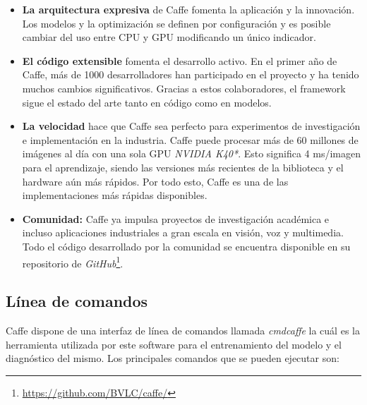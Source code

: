 \documentclass[a4paper, 12pt, spanish, chapterprefix, numbers=noenddot]{book}
\begin{document}
\begin{itemize}
\item \textbf{La arquitectura expresiva} de Caffe fomenta la aplicación y la innovación. Los modelos y la optimización se definen por configuración y es posible cambiar del uso entre CPU y GPU modificando un único indicador.
\item \textbf{El código extensible} fomenta el desarrollo activo. En el primer año de Caffe, más de 1000 desarrolladores han participado en el proyecto y ha tenido muchos cambios significativos. Gracias a estos colaboradores, el framework sigue el estado del arte tanto en código como en modelos.
\item \textbf{La velocidad} hace que Caffe sea perfecto para experimentos de investigación e implementación en la industria. Caffe puede procesar más de 60 millones de imágenes al día con una sola GPU \textit{NVIDIA K40*}. Esto significa 4 ms/imagen para el aprendizaje, siendo las versiones más recientes de la biblioteca y el hardware aún más rápidos. Por todo esto, Caffe es una de las implementaciones más rápidas disponibles.
\item \textbf{Comunidad:} Caffe ya impulsa proyectos de investigación académica e incluso aplicaciones industriales a gran escala en visión, voz y multimedia. Todo el código desarrollado por la comunidad se encuentra disponible en su repositorio de \textit{GitHub}\footnote{\url{https://github.com/BVLC/caffe/}}.
\end{itemize}

\subsection{Línea de comandos}

Caffe dispone de una interfaz de línea de comandos llamada \textit{cmdcaffe}\cite{CaffeInterface} la cuál es la herramienta utilizada por este software para el entrenamiento del modelo y el diagnóstico del mismo. Los principales comandos que se pueden ejecutar son:
\end{document}
